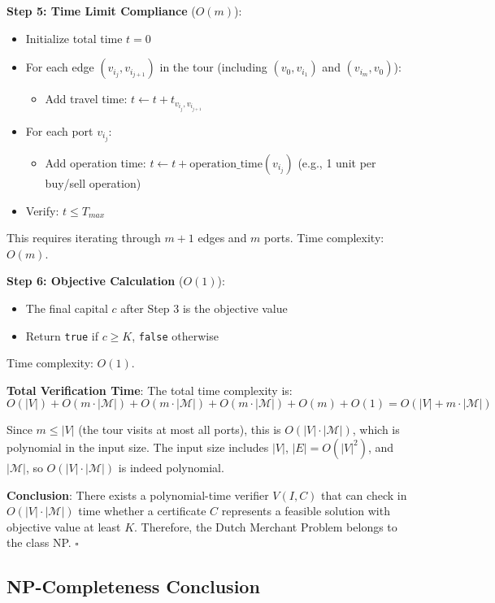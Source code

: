 \documentclass[12pt]{article}
\begin{document}
\textbf{Step 5: Time Limit Compliance} ($O(m)$):
\begin{itemize}
    \item Initialize total time $t = 0$
    \item For each edge $(v_{i_j}, v_{i_{j+1}})$ in the tour (including $(v_0, v_{i_1})$ and $(v_{i_m}, v_0)$):
    \begin{itemize}
        \item Add travel time: $t \leftarrow t + t_{v_{i_j}, v_{i_{j+1}}}$
    \end{itemize}
    \item For each port $v_{i_j}$:
    \begin{itemize}
        \item Add operation time: $t \leftarrow t + \text{operation\_time}(v_{i_j})$ (e.g., 1 unit per buy/sell operation)
    \end{itemize}
    \item Verify: $t \leq T_{max}$
\end{itemize}
This requires iterating through $m+1$ edges and $m$ ports. Time complexity: $O(m)$.

\textbf{Step 6: Objective Calculation} ($O(1)$):
\begin{itemize}
    \item The final capital $c$ after Step 3 is the objective value
    \item Return \texttt{true} if $c \geq K$, \texttt{false} otherwise
\end{itemize}
Time complexity: $O(1)$.

\textbf{Total Verification Time}: The total time complexity is:
$$O(|V|) + O(m \cdot |\mathcal{M}|) + O(m \cdot |\mathcal{M}|) + O(m \cdot |\mathcal{M}|) + O(m) + O(1) = O(|V| + m \cdot |\mathcal{M}|)$$

Since $m \leq |V|$ (the tour visits at most all ports), this is $O(|V| \cdot |\mathcal{M}|)$, which is polynomial in the input size. The input size includes $|V|$, $|E| = O(|V|^2)$, and $|\mathcal{M}|$, so $O(|V| \cdot |\mathcal{M}|)$ is indeed polynomial.

\textbf{Conclusion}: There exists a polynomial-time verifier $V(I, C)$ that can check in $O(|V| \cdot |\mathcal{M}|)$ time whether a certificate $C$ represents a feasible solution with objective value at least $K$. Therefore, the Dutch Merchant Problem belongs to the class NP. \hfill $\square$

\subsection{NP-Completeness Conclusion}
\end{document}
